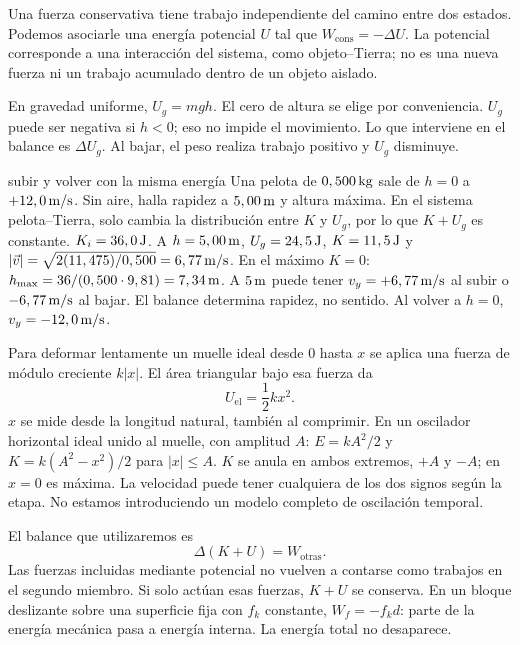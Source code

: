 \documentclass[11pt,a4paper]{article}
\begin{document}
Una fuerza conservativa tiene trabajo independiente del camino entre dos estados.
Podemos asociarle una energ\'ia potencial $U$ tal que $W_{\mathrm{cons}}=-\Delta U$.
La potencial corresponde a una interacci\'on del sistema, como objeto--Tierra;
no es una nueva fuerza ni un trabajo acumulado dentro de un objeto aislado.

En gravedad uniforme, $U_g=mgh$. El cero de altura se elige por conveniencia.
$U_g$ puede ser negativa si $h<0$; eso no impide el movimiento.
Lo que interviene en el balance es $\Delta U_g$.
Al bajar, el peso realiza trabajo positivo y $U_g$ disminuye.

\begin{examplebox}{subir y volver con la misma energ\'ia}
 Una pelota de $0,500\,\mathrm{kg}$ sale de $h=0$ a $+12,0\,\mathrm{m/s}$.
Sin aire, halla rapidez a $5,00\,\mathrm{m}$ y altura m\'axima.
\solutionblock
{} En el sistema pelota--Tierra, solo cambia la distribuci\'on
entre $K$ y $U_g$, por lo que $K+U_g$ es constante.
 $K_i=36,0\,\mathrm{J}$.
A $h=5,00\,\mathrm{m}$, $U_g=24,5\,\mathrm{J}$, $K=11,5\,\mathrm{J}$ y
$|\vec v|=\sqrt{2(11,475)/0,500}=6,77\,\mathrm{m/s}$.
En el m\'aximo $K=0$: $h_{\max}=36/(0,500\cdot9,81)=7,34\,\mathrm{m}$.
 A $5\,\mathrm{m}$ puede tener $v_y=+6,77\,\mathrm{m/s}$ al subir
o $-6,77\,\mathrm{m/s}$ al bajar. El balance determina rapidez, no sentido.
Al volver a $h=0$, $v_y=-12,0\,\mathrm{m/s}$.
\end{examplebox}

Para deformar lentamente un muelle ideal desde $0$ hasta $x$ se aplica una fuerza
de m\'odulo creciente $k|x|$. El \'area triangular bajo esa fuerza da
\[
U_{\mathrm{el}}=\frac12kx^2.
\]
$x$ se mide desde la longitud natural, tambi\'en al comprimir.
En un oscilador horizontal ideal unido al muelle, con amplitud $A$:
$E=kA^2/2$ y $K=k(A^2-x^2)/2$ para $|x|\le A$.
$K$ se anula en ambos extremos, $+A$ y $-A$; en $x=0$ es m\'axima.
La velocidad puede tener cualquiera de los dos signos seg\'un la etapa.
No estamos introduciendo un modelo completo de oscilaci\'on temporal.

El balance que utilizaremos es
\[
\Delta(K+U)=W_{\mathrm{otras}}.
\]
Las fuerzas incluidas mediante potencial no vuelven a contarse como trabajos en
el segundo miembro. Si solo act\'uan esas fuerzas, $K+U$ se conserva.
En un bloque deslizante sobre una superficie fija con $f_k$ constante,
$W_f=-f_kd$: parte de la energ\'ia mec\'anica pasa a energ\'ia interna.
La energ\'ia total no desaparece.
\end{document}
